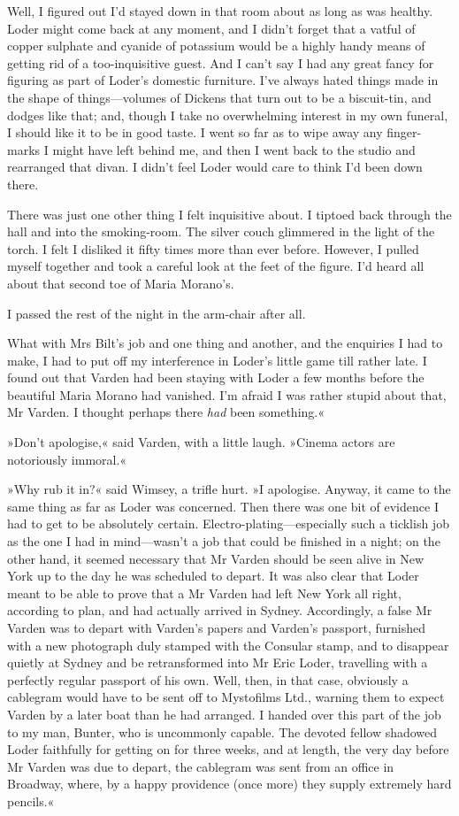 Well, I figured out I'd stayed down in that room about as long as was healthy. Loder might come back at any moment, and I didn't forget that a vatful of copper sulphate and cyanide of potassium would be a highly handy means of getting rid of a too-inquisitive guest. And I can't say I had any great fancy for figuring as part of Loder's domestic furniture. I've always hated things made in the shape of things—volumes of Dickens that turn out to be a biscuit-tin, and dodges like that; and, though I take no overwhelming interest in my own funeral, I should like it to be in good taste. I went so far as to wipe away any finger-marks I might have left behind me, and then I went back to the studio and rearranged that divan. I didn't feel Loder would care to think I'd been down there.

There was just one other thing I felt inquisitive about. I tiptoed back through the hall and into the smoking-room. The silver couch glimmered in the light of the torch. I felt I disliked it fifty times more than ever before. However, I pulled myself together and took a careful look at the feet of the figure. I'd heard all about that second toe of Maria Morano's.

I passed the rest of the night in the arm-chair after all.

What with Mrs Bilt's job and one thing and another, and the enquiries I had to make, I had to put off my interference in Loder's little game till rather late. I found out that Varden had been staying with Loder a few months before the beautiful Maria Morano had vanished. I'm afraid I was rather stupid about that, Mr Varden. I thought perhaps there \textit{had} been something.«

»Don't apologise,« said Varden, with a little laugh. »Cinema actors are notoriously immoral.«

»Why rub it in?« said Wimsey, a trifle hurt. »I apologise. Anyway, it came to the same thing as far as Loder was concerned. Then there was one bit of evidence I had to get to be absolutely certain. Electro-plating—especially such a ticklish job as the one I had in mind—wasn't a job that could be finished in a night; on the other hand, it seemed necessary that Mr Varden should be seen alive in New York up to the day he was scheduled to depart. It was also clear that Loder meant to be able to prove that a Mr Varden had left New York all right, according to plan, and had actually arrived in Sydney. Accordingly, a false Mr Varden was to depart with Varden's papers and Varden's passport, furnished with a new photograph duly stamped with the Consular stamp, and to disappear quietly at Sydney and be retransformed into Mr Eric Loder, travelling with a perfectly regular passport of his own. Well, then, in that case, obviously a cablegram would have to be sent off to Mystofilms Ltd., warning them to expect Varden by a later boat than he had arranged. I handed over this part of the job to my man, Bunter, who is uncommonly capable. The devoted fellow shadowed Loder faithfully for getting on for three weeks, and at length, the very day before Mr Varden was due to depart, the cablegram was sent from an office in Broadway, where, by a happy providence (once more) they supply extremely hard pencils.«

